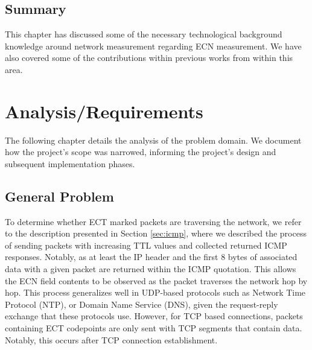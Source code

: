 \documentclass{l4proj}
\begin{document}




\section{Summary}

This chapter has discussed some of the necessary technological background knowledge around network measurement regarding ECN measurement. We have also covered some of the contributions within previous works from within this area.



\chapter{Analysis/Requirements}
\label{chap:analysis}

The following chapter details the analysis of the problem domain. We document how the project's scope was narrowed, informing the project's design and subsequent implementation phases.

\section{General Problem}
\label{sec:general}


To determine whether ECT marked packets are traversing the network, we refer to the description presented in Section \ref{sec:icmp}, where we described the process of sending packets with increasing TTL values and collected returned ICMP responses. Notably, as at least the IP header and the first 8 bytes of associated data with a given packet are returned within the ICMP quotation. This allows the ECN field contents to be observed as the packet traverses the network hop by hop. This process generalizes well in UDP-based protocols such as Network Time Protocol (NTP), or Domain Name Service (DNS), given the request-reply exchange that these protocols use. However, for TCP based connections, packets containing ECT codepoints are only sent with TCP segments that contain data. Notably, this occurs after TCP connection establishment.
\end{document}
